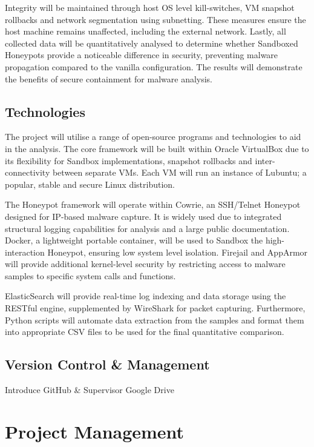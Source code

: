 \documentclass[a4paper,12pt,oneside]{book}			%
\begin{document}
Integrity will be maintained through host OS level kill-switches, VM snapshot rollbacks and network segmentation using subnetting. These measures ensure the host machine remains unaffected, including the external network. Lastly, all collected data will be quantitatively analysed to determine whether Sandboxed Honeypots provide a noticeable difference in security, preventing malware propagation compared to the vanilla configuration. The results will demonstrate the benefits of secure containment for malware analysis.


\section{Technologies}\label{sec:technologies}

The project will utilise a range of open-source programs and technologies to aid in the analysis. The core framework will be built within Oracle VirtualBox due to its flexibility for Sandbox implementations, snapshot rollbacks and inter-connectivity between separate VMs. Each VM will run an instance of Lubuntu; a popular, stable and secure Linux distribution.

The Honeypot framework will operate within Cowrie, an SSH/Telnet Honeypot designed for IP-based malware capture. It is widely used due to integrated structural logging capabilities for analysis and a large public documentation. Docker, a lightweight portable container, will be used to Sandbox the high-interaction Honeypot, ensuring low system level isolation. Firejail and AppArmor will provide additional kernel-level security by restricting access to malware samples to specific system calls and functions. 

ElasticSearch will provide real-time log indexing and data storage using the RESTful engine, supplemented by WireShark for packet capturing. Furthermore, Python scripts will automate data extraction from the samples and format them into appropriate CSV files to be used for the final quantitative comparison. 

\section{Version Control \&{} Management}\label{sec:versionControl}
Introduce GitHub \&{} Supervisor Google Drive


\chapter{Project Management}\label{ch:project management}
\end{document}
